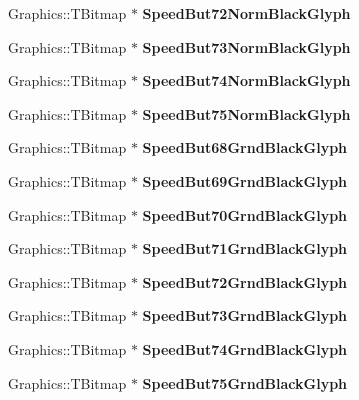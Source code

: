 \begin{DoxyCompactItemize}
\item 
\mbox{\label{class_t_rail_graphics_a3cab25a4d8cb8f7bc8a9112c35665977}} 
Graphics\+::\+T\+Bitmap $\ast$ {\bfseries Speed\+But72\+Norm\+Black\+Glyph}
\item 
\mbox{\label{class_t_rail_graphics_aaec446ce70a8ce8c49f5938324a526c1}} 
Graphics\+::\+T\+Bitmap $\ast$ {\bfseries Speed\+But73\+Norm\+Black\+Glyph}
\item 
\mbox{\label{class_t_rail_graphics_a7f9cb9f4b74c58bc18aac4cfd7b346f7}} 
Graphics\+::\+T\+Bitmap $\ast$ {\bfseries Speed\+But74\+Norm\+Black\+Glyph}
\item 
\mbox{\label{class_t_rail_graphics_a5df8ac834e73a4aadd601b2a06e5551f}} 
Graphics\+::\+T\+Bitmap $\ast$ {\bfseries Speed\+But75\+Norm\+Black\+Glyph}
\item 
\mbox{\label{class_t_rail_graphics_a655a56bc8b79b3e51a781f2ffd088067}} 
Graphics\+::\+T\+Bitmap $\ast$ {\bfseries Speed\+But68\+Grnd\+Black\+Glyph}
\item 
\mbox{\label{class_t_rail_graphics_a3292eb1ef693cb95a1da22c2ec70c82b}} 
Graphics\+::\+T\+Bitmap $\ast$ {\bfseries Speed\+But69\+Grnd\+Black\+Glyph}
\item 
\mbox{\label{class_t_rail_graphics_a56f1776fc3b800273d04793fb0dc6ee6}} 
Graphics\+::\+T\+Bitmap $\ast$ {\bfseries Speed\+But70\+Grnd\+Black\+Glyph}
\item 
\mbox{\label{class_t_rail_graphics_a00dd68c4f9be48b7c6ff7999e12f1a60}} 
Graphics\+::\+T\+Bitmap $\ast$ {\bfseries Speed\+But71\+Grnd\+Black\+Glyph}
\item 
\mbox{\label{class_t_rail_graphics_ac90d9133819e848c2b7bbbabf74bc112}} 
Graphics\+::\+T\+Bitmap $\ast$ {\bfseries Speed\+But72\+Grnd\+Black\+Glyph}
\item 
\mbox{\label{class_t_rail_graphics_abd1a40fb2d73ae06bd4b39abe9ec3e33}} 
Graphics\+::\+T\+Bitmap $\ast$ {\bfseries Speed\+But73\+Grnd\+Black\+Glyph}
\item 
\mbox{\label{class_t_rail_graphics_a08455751f2ba853eb6a7cc28e0df50e5}} 
Graphics\+::\+T\+Bitmap $\ast$ {\bfseries Speed\+But74\+Grnd\+Black\+Glyph}
\item 
\mbox{\label{class_t_rail_graphics_acc265d40f67b2f906bb6c0f4884154a8}} 
Graphics\+::\+T\+Bitmap $\ast$ {\bfseries Speed\+But75\+Grnd\+Black\+Glyph}
\end{DoxyCompactItemize}


